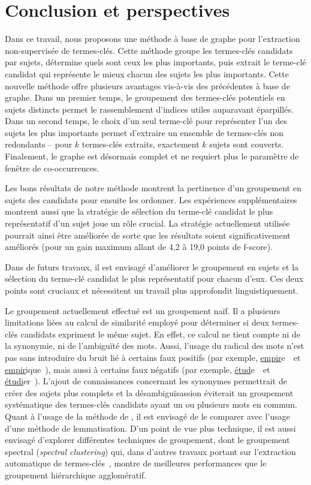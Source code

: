 \section{Conclusion et perspectives}
\label{sec:conclusion_et_perspectives}
  Dans ce travail, nous proposons une méthode à base de graphe pour
  l'extraction non-supervisée de termes-clés. Cette méthode groupe les
  termes-clés candidats par sujets, détermine quels sont ceux les plus
  importants, puis extrait le terme-clé candidat qui représente le mieux chacun
  des sujets les plus importants. Cette nouvelle méthode offre plusieurs
  avantages vis-à-vis des précédentes à base de graphe. Dans un premier temps,
  le groupement des termes-clés potentiels en sujets distincts permet le
  rassemblement d'indices utiles auparavant éparpillés. Dans un second temps,
  le choix d'un seul terme-clé pour représenter l'un des sujets les plus
  importants permet d'extraire un ensemble de termes-clés non redondants -- pour
  $k$ termes-clés extraits, exactement $k$ sujets sont couverts. Finalement, le
  graphe est désormais complet et ne requiert plus le paramètre de fenêtre de
  co-occurrences.

  Les bons résultats de notre méthode montrent la pertinence d'un groupement en
  sujets des candidats pour ensuite les ordonner. Les expériences
  supplémentaires montrent aussi que la stratégie de sélection du terme-clé
  candidat le plus représentatif d'un sujet joue un rôle crucial. La stratégie
  actuellement utilisée pourrait ainsi être améliorée de sorte que les résultats
  soient significativement améliorés (pour un gain maximum allant de 4,2 à 19,0
  points de f-score).

  Dans de futurs travaux, il est envisagé d'améliorer le groupement en sujets et
  la sélection du terme-clé candidat le plus représentatif pour chacun d'eux.
  Ces deux points sont cruciaux et nécessitent un travail plus approfondit
  linguistiquement.
  
  Le groupement actuellement effectué est un groupement naïf. Il a plusieurs
  limitations liées au calcul de similarité employé pour déterminer si deux
  termes-clés candidats expriment le même sujet. En effet, ce calcul ne tient
  compte ni de la synonymie, ni de l'ambiguïté des mots. Aussi, l'usage du
  radical des mots n'est pas sans introduire du bruit lié à certains faux
  positifs (par exemple, \og \underline{empir}e~\fg\ et
  \og \underline{empir}ique~\fg), mais aussi à certains faux négatifs (par
  exemple, \og \underline{étud}e~\fg\ et \og \underline{étudi}er~\fg). L'ajout
  de connaissances concernant les synonymes permettrait de créer des sujets plus
  complets et la désambiguïsassion éviterait un groupement systématique des
  termes-clés candidats ayant un ou plusieurs mots en commun. Quant à l'usage de
  la méthode de , il est envisagé de le
  comparer avec l'usage d'une méthode de lemmatisation. D'un point de vue plus
  technique, il est aussi envisagé d'explorer différentes techniques de
  groupement, dont le groupement spectral (\textit{spectral clustering}) qui,
  dans d'autres travaux portant sur l'extraction automatique de
  termes-clés~\cite{liu2009keycluster}, montre de meilleures performances que le
  groupement hiérarchique agglomératif.


